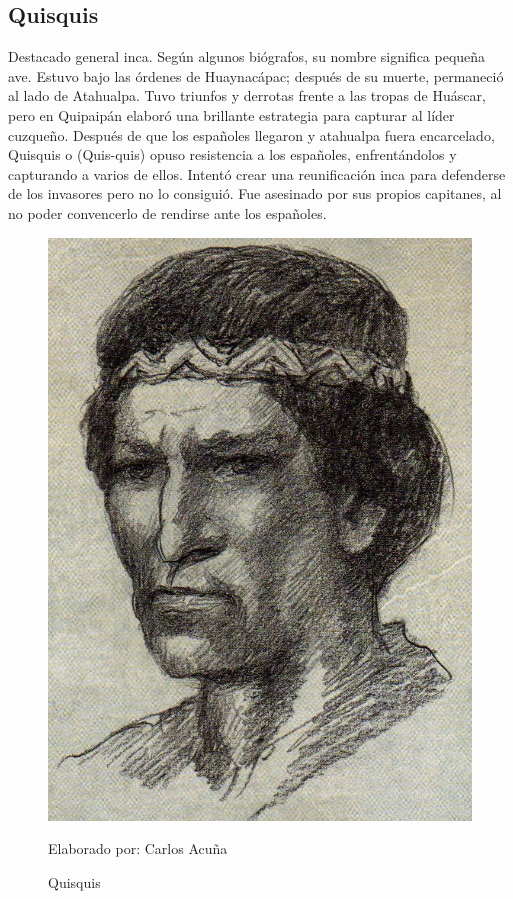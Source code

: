 \documentclass[a4paper, openright, 12pt]{report}
\begin{document}
\subsection*{Quisquis}
\justify
Destacado general inca. Según algunos biógrafos, su nombre significa pequeña ave. Estuvo bajo las órdenes de Huaynacápac; después de su muerte, permaneció al lado de Atahualpa. Tuvo triunfos y derrotas frente a las tropas de Huáscar, pero en Quipaipán elaboró una brillante estrategia para capturar al líder cuzqueño. Después de que los españoles llegaron y atahualpa fuera encarcelado, Quisquis o (Quis-quis) opuso resistencia a los españoles, enfrentándolos y capturando a varios de ellos. Intentó crear una reunificación inca para defenderse de los invasores pero no lo consiguió. Fue asesinado por sus propios capitanes, al no poder convencerlo de rendirse ante los españoles. \cite{2010batallas}

\begin{figure}[h]
\captionsetup{justification=centering,margin=2cm}
\includegraphics[scale=1]{h5}
\centering
\caption{Quisquis}
Elaborado por: Carlos Acuña
\label{fig:h5}
\end{figure}
\end{document}
